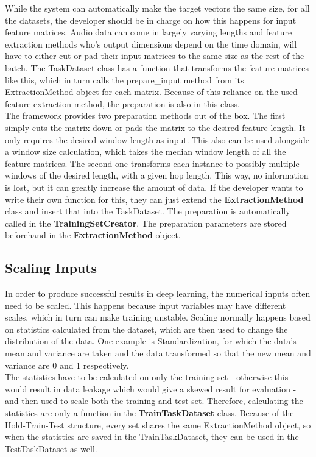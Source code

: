 While the system can automatically make the target vectors the same size, for all the datasets, the developer should be in charge on how this happens for input feature matrices. Audio data can come in largely varying lengths and feature extraction methods who's output dimensions depend on the time domain, will have to either cut or pad their input matrices to the same size as the rest of the batch. The TaskDataset class has a function that transforms the feature matrices like this, which in turn calls the prepare\_input method from its ExtractionMethod object for each matrix. Because of this reliance on the used feature extraction method, the preparation is also in this class. \\

The framework provides two preparation methods out of the box. The first simply cuts the matrix down or pads the matrix to the desired feature length. It only requires the desired window length as input. This also can be used alongside a window size calculation, which takes the median window length of all the feature matrices. The second one transforms each instance to possibly multiple windows of the desired length, with a given hop length. This way, no information is lost, but it can greatly increase the amount of data. If the developer wants to write their own function for this, they can just extend the \textbf{ExtractionMethod} class and insert that into the TaskDataset. The preparation is automatically called in the \textbf{TrainingSetCreator}. The preparation parameters are stored beforehand in the \textbf{ExtractionMethod} object.\\

\subsection{Scaling Inputs} \label{Impl:DataLoad:Scale}

In order to produce successful results in deep learning, the numerical inputs often need to be scaled. This happens because input variables may have different scales, which in turn can make training unstable. Scaling normally happens based on statistics calculated from the dataset, which are then used to change the distribution of the data. One example is Standardization, for which the data's mean and variance are taken and the data transformed so that the new mean and variance are 0 and 1 respectively. \\

The statistics have to be calculated on only the training set - otherwise this would result in data leakage which would give a skewed result for evaluation - and then used to scale both the training and test set. Therefore, calculating the statistics are only a function in the \textbf{TrainTaskDataset} class. Because of the Hold-Train-Test structure, every set shares the same ExtractionMethod object, so when the statistics are saved in the TrainTaskDataset, they can be used in the TestTaskDataset as well. \\

